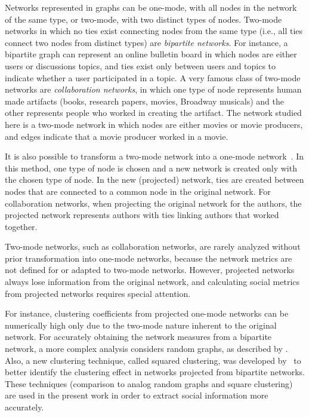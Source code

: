 Networks represented in graphs can be one-mode, with all nodes in the network
of the same type, or two-mode, with two distinct types of nodes. Two-mode
networks in which no ties exist connecting nodes from the same type (i.e., all
ties connect two nodes from distinct types) are \textit{bipartite networks}.
For instance, a bipartite graph can represent an online bulletin board in
which nodes are either users or discussions topics, and ties exist only between
users and topics to indicate whether a user participated in a topic. A very
famous class of two-mode networks are \textit{collaboration networks}, in which
one type of node represents human made artifacts (books, research papers,
movies, Broadway musicals) and the other represents people who worked in
creating the artifact. The network studied here is a two-mode network in which
nodes are either movies or movie producers, and edges indicate that a movie
producer worked in a movie.

It is also possible to transform a two-mode network into a one-mode
network~\cite{newman2003structure}. In this method, one type of node is chosen
and a new network is created only with the chosen type of node. In the new
(projected) network, ties are created between nodes that are connected to a
common node in the original network. For collaboration networks, when
projecting the original network for the authors, the projected network
represents authors with ties linking authors that worked together.

Two-mode networks, such as collaboration networks, are rarely analyzed without
prior transformation into one-mode networks, because the network metrics are
not defined for or adapted to two-mode networks. However, projected networks
always lose information from the original network, and calculating social
metrics from projected networks requires special attention.

For instance, clustering coefficients from projected one-mode networks can be
numerically high only due to the two-mode nature inherent to the original
network. For accurately obtaining the network measures from a bipartite
network, a more complex analysis considers random graphs, as described by
\cite{newman2003structure}. Also, a new clustering technique, called squared
clustering, was developed by~\cite{lind2005cycles} to better identify the
clustering effect in networks projected from bipartite networks. These
techniques (comparison to analog random graphs and square clustering) are used
in the present work in order to extract social information more accurately.

